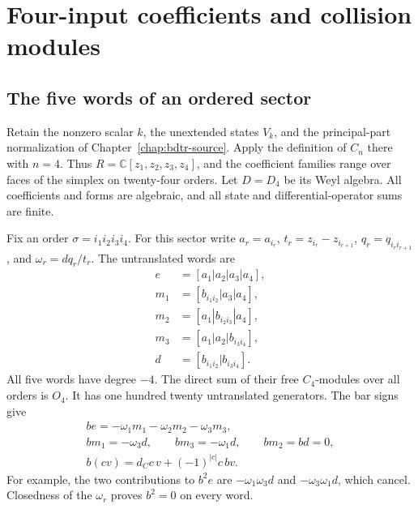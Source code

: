 \chapter{Four-input coefficients and collision modules}
\label{chap:bdfour-source}

\section{The five words of an ordered sector}

Retain the nonzero scalar $k$, the unextended states $V_k$, and the principal-part normalization of Chapter~\ref{chap:bdtr-source}.
Apply the definition of $C_n$ there with $n=4$.
Thus $R=\mathbb C[z_1,z_2,z_3,z_4]$, and the coefficient families range over faces of the simplex on twenty-four orders.
Let $D=D_4$ be its Weyl algebra.
All coefficients and forms are algebraic, and all state and differential-operator sums are finite.

Fix an order $\sigma=i_1i_2i_3i_4$.
For this sector write $a_r=a_{i_r}$,
$t_r=z_{i_r}-z_{i_{r+1}}$, $q_r=q_{i_ri_{r+1}}$, and $\omega_r=dq_r/t_r$.
The untranslated words are
\[
 \begin{aligned}
 e&=[a_1|a_2|a_3|a_4],\\
 m_1&=[b_{i_1i_2}|a_3|a_4],\\
 m_2&=[a_1|b_{i_2i_3}|a_4],\\
 m_3&=[a_1|a_2|b_{i_3i_4}],\\
 d&=[b_{i_1i_2}|b_{i_3i_4}].
 \end{aligned}
\]
All five words have degree $-4$.
The direct sum of their free $C_4$-modules over all orders is $O_4$.
It has one hundred twenty untranslated generators.
The bar signs give
\begin{equation}\label{eq:bdfour-bar}
 \begin{gathered}
 be=-\omega_1m_1-\omega_2m_2-\omega_3m_3,\\
 bm_1=-\omega_3d,\qquad bm_3=-\omega_1d,\qquad bm_2=bd=0,\\
 b(cv)=d_Cc\,v+(-1)^{|c|}c\,bv.
 \end{gathered}
\end{equation}
For example, the two contributions to $b^2e$ are
$-\omega_1\omega_3d$ and $-\omega_3\omega_1d$, which cancel.
Closedness of the $\omega_r$ proves $b^2=0$ on every word.

